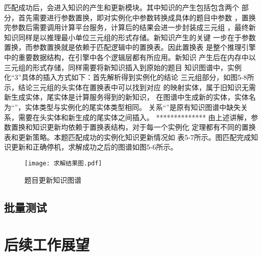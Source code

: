 \documentclass{standalone}
\begin{document}
匹配成功后，会进入知识的产生和更新模块。其中知识的产生包括包含两个
部分，首先需要进行参数置换，即对实例化中参数转换成具体的题目中参数
，置换完参数后需要调用计算平台服务，计算后的结果会进一步封装成三元组
，最终新知识同样是以推理最小单位三元组的形式存储。新知识产生的关键
一步在于参数置换，而参数置换就是依赖于匹配逻辑中的置换表。因此置换表
是整个推理引擎中的重要数据结构，在引擎中各个逻辑层都有所应用。新知识
产生后在内存中以三元组的形式存储，同样需要将新知识插入到原始的题目
知识图谱中，实例化“3”具体的插入方式如下：首先解析得到实例化的结论
三元组部分，如图5-8所示，结论三元组的头实体在置换表中可以找到对应
的映射实体，属于旧知识无需新生成实体，尾实体是计算服务得到的新知识，
在图谱中生成新的实体，实体名为“”，实体类型与实例化的尾实体类型相同。
关系“”是原有知识图谱中缺失关系，需要在头实体和新生成的尾实体之间插入。
**************
由上述讲解，参数置换和知识更新均依赖于置换表结构，对于每一个实例化
定理都有不同的置换表和更新策略。本题匹配成功的实例化知识更新情况如
表5-7所示。图匹配完成知识更新和正确停机，求解成功之后的图谱如图5-6所示。
\begin{figure}[htbp]
	\texttt{[image: 求解结果图.pdf]}
	\caption{题目更新知识图谱}
	\label{求解结果图}
\end{figure}
\subsection{批量测试}

\section{后续工作展望}
\end{document}
